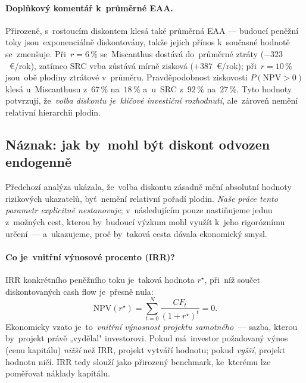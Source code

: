 \paragraph{Doplňkový komentář k~průměrné EAA.}
Přirozeně, s~rostoucím diskontem klesá také průměrná EAA --- budoucí
peněžní toky jsou~exponenciálně diskontovány, takže jejich přínos
k~současné hodnotě se~zmenšuje. Při~$r = 6\,\%$ se~Miscanthus dostává
do~průměrné ztráty ($-323$~€/rok), zatímco SRC vrba zůstává mírně
zisková ($+387$~€/rok); při~$r = 10\,\%$ jsou~obě plodiny ztrátové
v~průměru. Pravděpodobnost ziskovosti $P(\mathrm{NPV} > 0)$ klesá
u~Miscanthusu z~$67\,\%$ na~$18\,\%$ a~u~SRC z~$92\,\%$ na~$27\,\%$.
Tyto hodnoty potvrzují, že~\emph{volba diskontu je~klíčové investiční
rozhodnutí}, ale~zároveň nemění relativní hierarchii plodin.

\subsection{Náznak: jak by~mohl být diskont odvozen endogenně}
\label{subsec:vysledky-diskont-irr}

Předchozí analýza ukázala, že~volba diskontu zásadně mění absolutní
hodnoty rizikových ukazatelů, byť~nemění relativní pořadí plodin.
\emph{Naše práce tento parametr explicitně nestanovuje}; v~následujícím
pouze nastiňujeme jednu z~možných cest, kterou by~budoucí výzkum
mohl využít k~jeho rigoróznímu určení~--- a~ukazujeme, proč by~taková
cesta dávala ekonomický smysl.

\paragraph{Co je~vnitřní výnosové procento (IRR)?}
IRR konkrétního peněžního toku je~taková hodnota $r^{\star}$, při~níž
součet diskontovaných cash flow je~přesně nula:
\[
\mathrm{NPV}(r^{\star}) = \sum_{t=0}^{N} \frac{CF_t}{(1+r^{\star})^t} = 0.
\]
Ekonomicky vzato je~to~\emph{vnitřní výnosnost projektu samotného}~---
sazba, kterou by~projekt právě „vydělal" investorovi. Pokud má~investor
požadovaný výnos (cenu kapitálu) \emph{nižší} než IRR, projekt vytváří
hodnotu; pokud \emph{vyšší}, projekt hodnotu ničí. IRR tedy slouží
jako přirozený benchmark, ke~kterému lze poměřovat náklady kapitálu.

